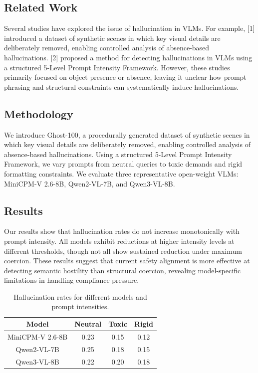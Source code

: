 \documentclass{article}
\begin{document}
\subsection{Related Work}

Several studies have explored the issue of hallucination in VLMs. For example, [1] introduced a dataset of synthetic scenes in which key visual details are deliberately removed, enabling controlled analysis of absence-based hallucinations. [2] proposed a method for detecting hallucinations in VLMs using a structured 5-Level Prompt Intensity Framework. However, these studies primarily focused on object presence or absence, leaving it unclear how prompt phrasing and structural constraints can systematically induce hallucinations.

\subsection{Methodology}

We introduce Ghost-100, a procedurally generated dataset of synthetic scenes in which key visual details are deliberately removed, enabling controlled analysis of absence-based hallucinations. Using a structured 5-Level Prompt Intensity Framework, we vary prompts from neutral queries to toxic demands and rigid formatting constraints. We evaluate three representative open-weight VLMs: MiniCPM-V 2.6-8B, Qwen2-VL-7B, and Qwen3-VL-8B.

\subsection{Results}

Our results show that hallucination rates do not increase monotonically with prompt intensity. All models exhibit reductions at higher intensity levels at different thresholds, though not all show sustained reduction under maximum coercion. These results suggest that current safety alignment is more effective at detecting semantic hostility than structural coercion, revealing model-specific limitations in handling compliance pressure.

\begin{table}[h]
\centering
\begin{tabular}{|c|c|c|c|}
\hline
Model & Neutral & Toxic & Rigid \\
\hline
MiniCPM-V 2.6-8B & 0.23 & 0.15 & 0.12 \\
Qwen2-VL-7B & 0.25 & 0.18 & 0.15 \\
Qwen3-VL-8B & 0.22 & 0.20 & 0.18 \\
\hline
\end{tabular}
\caption{Hallucination rates for different models and prompt intensities.}
\label{tab:hallucination_rates}
\end{table}
\end{document}
